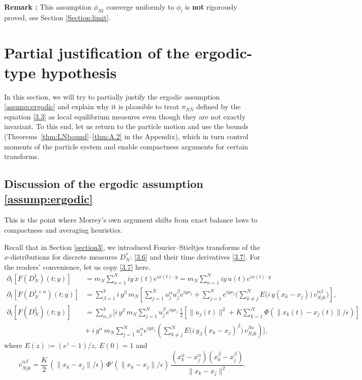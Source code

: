 \documentclass[11pt]{article}
\begin{document}
\textbf{Remark :} This assumption $\phi_{Nl}$ converge uniformly to $\phi_l$ is \textbf{not} rigorously proved, see Section \ref{Section:limit}.



\section{Partial justification of the ergodic-type hypothesis}\label{Fourier}

In this section, we will try to partially justify the ergodic assumption \ref{assump:ergodic} and explain why it is plausible to treat $\pi_{NN}$ defined by the equation \eqref{3.3} as local equilibrium measures even though they are not exactly invariant. To this end, let us return to the particle motion and use the bounds (Theorems~\ref{thm:LNbound}--\ref{thm:A.2} in the Appendix), which in turn control moments of the particle system and enable compactness arguments for certain transforms.

\subsection{Discussion of the ergodic assumption \ref{assump:ergodic}}
This is the point where Morrey's own argument shifts from exact balance laws to compactness and averaging heuristics.

Recall that in Section \ref{section3}, we introduced Fourier–Stieltjes transforms of the \(x\)-distributions for discrete measures $D^*_N$: \eqref{3.6} and their time derivatives \eqref{3.7}. For the readers' convenience, let us copy \eqref{3.7} here.
\begin{equation*}
\begin{aligned}
 \partial_t[F(D^1_N)(t;y)]&=m_N\sum_{n=1}^N iy\,\dot{x}(t)e^{ix(t)\cdot y}=m_N\sum_{n=1}^N iy\,u(t)e^{ix(t)\cdot y}\\[2pt]
\partial_t[F(D^{1+\alpha}_N)(t;y)] &=\sum_{\beta=1}^3i\,y^\beta\, m_N[\sum_{j=1}^Nu^\alpha_ju_j^\beta e^{iy x_j}+\sum_{j=1}^{N} e^{iyx_j}
 \Big( \sum_{k\neq j}^{N} E\big(i\,y(x_k-x_j)\big)\, v_{Njk}^{\alpha\beta}\Big)],\\[2pt]
\partial_t[F(D^{5}_N)(t;y)] &=\sum_{\alpha,\beta}^3 \Big[i\,y^\beta\, m_N\sum_{j=1}^{N}u_j^\beta e^{iyx_j}\,\frac{1}{2}[\|u_j(t)\|^2+K\sum_{k=1}^{N}\Phi(\|x_k(t)-x_j(t)\|/\epsilon)]
 \\& +\ i\,y^\alpha\, m_N\sum_{j=1}^{N}u_j^\alpha e^{iyx_j}
 ( \sum_{k\neq j}^{N} E\big(i\,y_\beta(x_k-x_j)^\beta\big)\, v_{Njk}^{\beta\alpha})\Big],
\end{aligned}
\end{equation*}
where $E(z):=(e^z-1)/z,\,E(0)=1$ and
\[
v_{Njk}^{\alpha\beta}
=\frac{K}{2}\,(\|x_k-x_j\|/\epsilon)\,\Phi'(\|x_k-x_j\|/\epsilon)\,
\frac{(x_k^\alpha-x_j^\alpha)(x_k^\beta-x_j^\beta)}{\|x_k-x_j\|^2}.
\]
\end{document}
